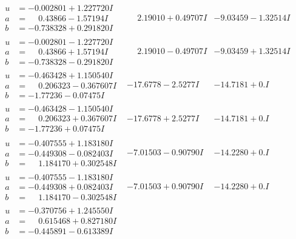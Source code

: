 \documentclass[1p]{elsarticle_modified}
\theoremstyle{definition}
\begin{document}
$$\begin{array}{c|c|c}
\begin{aligned}
u &= -0.002801 + 1.227720 I \\
a &= \phantom{-}0.43866 - 1.57194 I \\
b &= -0.738328 + 0.291820 I\end{aligned}
 & \phantom{-}2.19010 + 0.49707 I & -9.03459 - 1.32514 I \\ \hline\begin{aligned}
u &= -0.002801 - 1.227720 I \\
a &= \phantom{-}0.43866 + 1.57194 I \\
b &= -0.738328 - 0.291820 I\end{aligned}
 & \phantom{-}2.19010 - 0.49707 I & -9.03459 + 1.32514 I \\ \hline\begin{aligned}
u &= -0.463428 + 1.150540 I \\
a &= \phantom{-}0.206323 - 0.367607 I \\
b &= -1.77236 - 0.07475 I\end{aligned}
 & -17.6778 - 2.5277 I & -14.7181 + 0. I\phantom{ +0.000000I} \\ \hline\begin{aligned}
u &= -0.463428 - 1.150540 I \\
a &= \phantom{-}0.206323 + 0.367607 I \\
b &= -1.77236 + 0.07475 I\end{aligned}
 & -17.6778 + 2.5277 I & -14.7181 + 0. I\phantom{ +0.000000I} \\ \hline\begin{aligned}
u &= -0.407555 + 1.183180 I \\
a &= -0.449308 - 0.082403 I \\
b &= \phantom{-}1.184170 + 0.302548 I\end{aligned}
 & -7.01503 - 0.90790 I & -14.2280 + 0. I\phantom{ +0.000000I} \\ \hline\begin{aligned}
u &= -0.407555 - 1.183180 I \\
a &= -0.449308 + 0.082403 I \\
b &= \phantom{-}1.184170 - 0.302548 I\end{aligned}
 & -7.01503 + 0.90790 I & -14.2280 + 0. I\phantom{ +0.000000I} \\ \hline\begin{aligned}
u &= -0.370756 + 1.245550 I \\
a &= \phantom{-}0.615468 + 0.827180 I \\
b &= -0.445891 - 0.613389 I\end{aligned}

\end{array}$$
\end{document}
